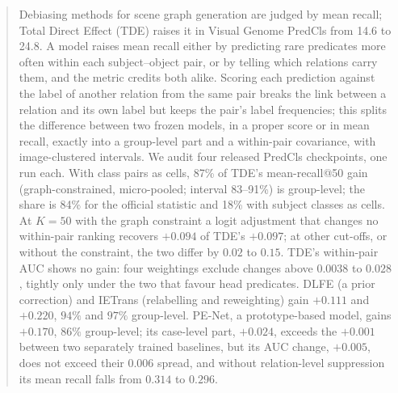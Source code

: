 \begin{abstract}
Debiasing methods for scene graph generation are judged by mean recall; Total Direct Effect
(TDE) raises it in Visual Genome PredCls from 14.6 to 24.8. A model raises mean recall either by
predicting rare predicates more often within each subject--object pair, or by telling which
relations carry them, and the metric credits both alike. Scoring each prediction against the
label of another relation from the same pair breaks the link between a relation and its own
label but keeps the pair's label frequencies; this splits the difference between two frozen
models, in a proper score or in mean recall, exactly into a group-level part and a within-pair
covariance, with image-clustered intervals. We audit four released PredCls checkpoints, one run
each. With class pairs as cells, 87\% of TDE's mean-recall@50 gain (graph-constrained,
micro-pooled; interval 83--91\%) is group-level; the share is 84\% for the official statistic and
18\% with subject classes as cells. At $K=50$ with the graph constraint a logit adjustment that
changes no within-pair ranking recovers $+0.094$ of TDE's $+0.097$; at other cut-offs, or
without the constraint, the two differ by $0.02$ to $0.15$. TDE's within-pair AUC shows no gain:
four weightings exclude changes above $0.0038$ to $0.028$, tightly only under the two that favour
head predicates. DLFE (a prior correction) and IETrans (relabelling and reweighting) gain
$+0.111$ and $+0.220$, $94\%$ and $97\%$ group-level. PE-Net, a prototype-based model, gains
$+0.170$, $86\%$ group-level; its case-level part, $+0.024$, exceeds the $+0.001$ between two
separately trained baselines, but its AUC change, $+0.005$, does not exceed their $0.006$ spread,
and without relation-level suppression its mean recall falls from $0.314$ to $0.296$.
\end{abstract}
